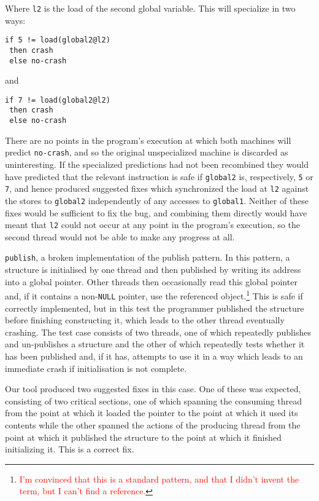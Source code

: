 \documentclass[10pt,twocolumn,preprint,natbib,authoryear]{sigplanconf}
\newcommand{\editorial}[1]{\textcolor{red}{\footnote{\textcolor{red}{#1}}}}
\begin{document}
Where \verb|l2| is the load of the second global variable.  This
will specialize in two ways:

\begin{verbatim}
if 5 != load(global2@l2)
 then crash
 else no-crash
\end{verbatim}

and

\begin{verbatim}
if 7 != load(global2@l2)
 then crash
 else no-crash
\end{verbatim}

There are no points in the program's execution at which both machines
will predict \verb|no-crash|, and so the original unspecialized
machine is discarded as uninteresting.  If the specialized predictions
had not been recombined they would have predicted that the relevant
instruction is safe if \verb|global2| is, respectively, \verb|5| or
\verb|7|, and hence produced suggested fixes which synchronized the
load at \verb|l2| against the stores to \verb|global2| independently
of any accesses to \verb|global1|.  Neither of these fixes would be
sufficient to fix the bug, and combining them directly would have
meant that \verb|l2| could not occur at any point in the program's
execution, so the second thread would not be able to make any progress
at all.

\verb|publish|, a broken implementation of the publish pattern.  In
this pattern, a structure is initialised by one thread and then
published by writing its address into a global pointer.  Other threads
then occasionally read this global pointer and, if it contains a
non-\verb|NULL| pointer, use the referenced object.\editorial{I'm
  convinced that this is a standard pattern, and that I didn't invent
  the term, but I can't find a reference.}  This is safe if correctly
implemented, but in this test the programmer published the structure
before finishing constructing it, which leads to the other thread
eventually crashing.  The test case consists of two threads, one of
which repeatedly publishes and un-publishes a structure and the other
of which repeatedly tests whether it has been published and, if it
has, attempts to use it in a way which leads to an immediate crash if
initialisation is not complete.

Our tool produced two suggested fixes in this case.  One of these was
expected, consisting of two critical sections, one of which spanning
the consuming thread from the point at which it loaded the pointer to
the point at which it used its contents while the other spanned the
actions of the producing thread from the point at which it published
the structure to the point at which it finished initializing it.  This
is a correct fix.
\end{document}

